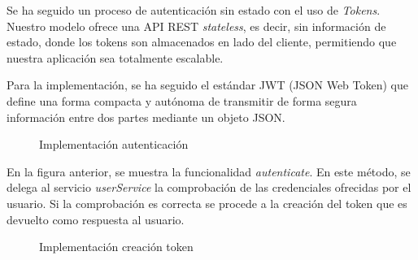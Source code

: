 Se ha seguido un proceso de autenticación sin estado con el uso de \textit{Tokens}. Nuestro modelo ofrece una API REST \textit{stateless}, es decir, sin información de estado, donde los tokens son almacenados en lado del cliente, permitiendo que nuestra aplicación sea totalmente escalable.

Para la implementación, se ha seguido el estándar JWT (JSON Web Token) que define una forma compacta y autónoma de transmitir de forma segura información entre dos partes mediante un objeto JSON.


\begin{figure}[H]
\centering
{}
\caption{Implementación autenticación}
\end{figure}

En la figura anterior, se muestra la funcionalidad \textit{autenticate}. En este método, se delega al servicio \textit{userService} la comprobación de las credenciales ofrecidas por el usuario. Si la comprobación es correcta se procede a la creación del token que es devuelto como respuesta al usuario.

\begin{figure}[H]
\centering
{}
\caption{Implementación creación token}
\end{figure}


